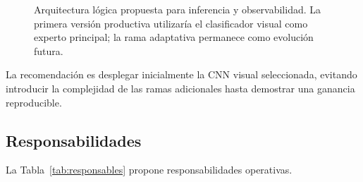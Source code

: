 \documentclass[letterpaper,11pt]{article}
\begin{document}
\begin{figure}[H] 
  \centering 

\caption{Arquitectura lógica propuesta para inferencia y observabilidad. La primera versión productiva utilizaría el clasificador visual como experto principal; la rama adaptativa permanece como evolución futura.} 
\label{fig:arquitectura}

\end{figure}

La recomendación es desplegar inicialmente la CNN visual seleccionada, evitando introducir la complejidad de las ramas adicionales hasta demostrar una ganancia reproducible. 

\subsection{Responsabilidades}

La Tabla~\ref{tab:responsables} propone responsabilidades operativas.
\end{document}
